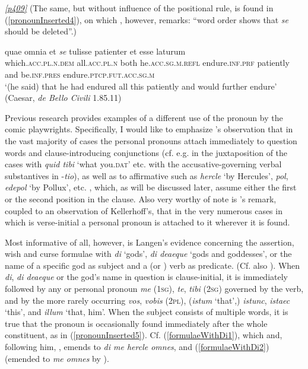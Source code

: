 \hyperlink{p409}{\emph{[p409]}} (The same, but without influence of the positional rule, is found in (\ref{pronounInserted4}), on which \citet[XX]{Paul1889}, however, remarks: ``word order shows that \emph{se} should be deleted''.)

\begin{exe}
\ex
\gll quae omnia et \emph{se} tulisse patienter et esse laturum\\
which.\textsc{acc.pl.n.dem} all.\textsc{acc.pl.n} both he.\textsc{acc.sg.m.refl} endure.\textsc{inf.prf} patiently and be.\textsc{inf.pres} endure.\textsc{ptcp.fut.acc.sg.m}\\
\trans `(he said) that he had endured all this patiently and would further endure' (Caesar, \textit{de Bello Civili} 1.85.11)
\label{pronounInserted4}
\end{exe}

Previous research provides examples of a different use of the pronoun by the comic playwrights. Specifically, I would like to emphasize \citeauthor{Kaempf1886}'s \citeyearpar[31, 36]{Kaempf1886} observation that in the vast majority of cases the personal pronouns attach immediately to question words and clause-introducing conjunctions (cf. e.g. in \citealp[243]{Bach1891} the juxtaposition of the cases with \emph{quid tibi} `what you.\textsc{dat}' etc. with the accusative-governing verbal substantives in -\emph{tio}), as well as to affirmative  such as \emph{hercle} `by Hercules', \emph{pol}, \emph{edepol} `by Pollux', etc. \citep[40]{Kaempf1886}, which, as will be discussed later, assume either the first or the second position in the clause. Also very worthy of note is \citeauthor{Kaempf1886}'s \citeyearpar{Kaempf1886} remark, coupled to an observation of Kellerhoff's, that in the very numerous cases in which  is verse-initial a personal pronoun is attached to it wherever it is found.

Most informative of all, however, is Langen's \citeyearpar[426ff.]{Langen1857}\label{godformulae} evidence concerning the assertion, wish and curse formulae with \emph{di} `gods', \emph{di deaeque} `gods and goddesses', or the name of a specific god as subject and a  (or ) verb as predicate. (Cf. also \citealp[77f.]{Kellerhoff1891}). When \emph{di}, \emph{di deaeque} or the god's name in question is clause-initial, it is immediately followed by any  or  personal pronoun \emph{me} (\textsc{1sg}), \emph{te}, \emph{tibi} (\textsc{2sg}) governed by the verb, and by the more rarely occurring \emph{vos}, \emph{vobis} (\textsc{2pl}), (\emph{istum} `that',) \emph{istunc}, \emph{istaec} `this', and \emph{illum} `that, him'. When the subject consists of multiple words, it is true that the pronoun is occasionally found immediately after the whole constituent, as in (\ref{pronounInserted5}). Cf. (\ref{formulaeWithDi1}), which \citet{Langen1857} and, following him, \citet{Goetz1878}, emends to \emph{di me hercle omnes}, and (\ref{formulaeWithDi2}) (emended to \emph{me omnes} by \citealp{Ritschl1852}).

